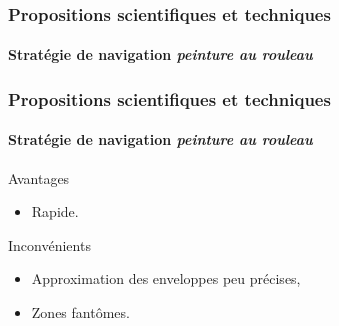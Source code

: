 \documentclass{beamer}
\begin{document}
			\begin{frame}
				\frametitle{Propositions scientifiques et techniques}
				\framesubtitle{Stratégie de navigation \textit{peinture au rouleau}}
				\begin{figure}[H]
					\centering
				\end{figure}
			\end{frame}
			\begin{frame}
				\frametitle{Propositions scientifiques et techniques}
				\framesubtitle{Stratégie de navigation \textit{peinture au rouleau}}
				\begin{exampleblock}{Avantages}
					\begin{itemize}
						\item Rapide.
					\end{itemize}
				\end{exampleblock}
				\begin{alertblock}{Inconvénients}
					\begin{itemize}
						\item Approximation des enveloppes peu précises,
						\item Zones fantômes.
					\end{itemize}
				\end{alertblock}
			\end{frame}
\end{document}
